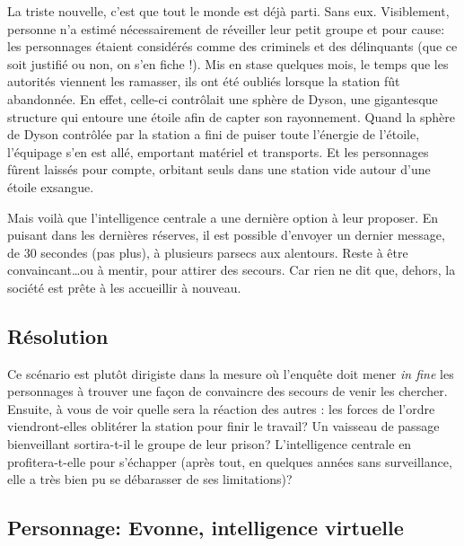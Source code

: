 La triste nouvelle, c'est que tout le monde est déjà parti. Sans eux.
Visiblement, personne n'a estimé nécessairement de réveiller leur petit groupe et pour cause: les personnages étaient considérés comme des criminels et des délinquants (que ce soit justifié ou non, on s'en fiche !).
Mis en stase quelques mois, le temps que les autorités viennent les ramasser, ils ont été \og oubliés \fg lorsque la station fût abandonnée.
En effet, celle-ci contrôlait une sphère de Dyson, une gigantesque structure qui entoure une étoile afin de capter son rayonnement.
Quand la sphère de Dyson contrôlée par la station a fini de puiser toute l'énergie de l'étoile, l'équipage s'en est allé, emportant matériel et transports.
Et les personnages fûrent laissés pour compte, orbitant seuls dans une station vide autour d'une étoile exsangue.

Mais voilà que l'intelligence centrale a une dernière option à leur proposer.
En puisant dans les dernières réserves, il est possible d'envoyer un dernier message, de 30 secondes (pas plus), à plusieurs parsecs aux alentours.
Reste à être convaincant\dots ou à mentir, pour attirer des secours.
Car rien ne dit que, dehors, la société est prête à les accueillir à nouveau.

\subsection{Résolution}

Ce scénario est plutôt dirigiste dans la mesure où l'enquête doit mener \emph{in fine} les personnages à trouver une façon de convaincre des secours de venir les chercher.
Ensuite, à vous de voir quelle sera la réaction des \og autres \og: les forces de l'ordre viendront-elles oblitérer la station pour finir le travail? Un vaisseau de passage bienveillant sortira-t-il le groupe de leur prison? L'intelligence centrale en profitera-t-elle pour s'échapper (après tout, en quelques années sans surveillance, elle a très bien pu se débarasser de ses limitations)?

\subsection{Personnage: Evonne, intelligence virtuelle}


